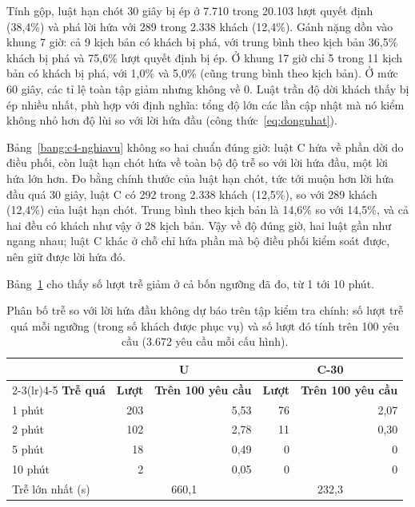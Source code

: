 Tính gộp, luật hạn chót 30 giây bị ép ở 7.710 trong 20.103 lượt quyết định (38,4\%) và phá lời hứa với 289 trong 2.338
khách (12,4\%). Gánh nặng dồn vào khung 7 giờ: cả 9 kịch bản có khách bị phá, với trung bình theo kịch bản 36,5\%
khách bị phá và 75,6\% lượt quyết định bị ép. Ở khung 17 giờ chỉ 5 trong 11 kịch bản có khách bị phá, với 1,0\% và
5,0\% (cũng trung bình theo kịch bản). Ở mức 60 giây, các tỉ lệ toàn tập giảm nhưng không về 0. Luật trần độ dời khách
thấy bị ép nhiều nhất, phù hợp với định nghĩa: tổng độ lớn các lần cập nhật mà nó kiểm không nhỏ hơn độ lùi so với lời
hứa đầu (công thức~\eqref{eq:dongnhat}).

Bảng~\ref{bang:c4-nghiavu} không so hai chuẩn đúng giờ: luật C hứa về phần dời do điều phối, còn luật hạn chót hứa về
toàn bộ độ trễ so với lời hứa đầu, một lời hứa lớn hơn. Đo bằng chính thước của luật hạn chót, tức tới muộn hơn lời
hứa đầu quá 30 giây, luật C có 292 trong 2.338 khách (12,5\%), so với 289 khách (12,4\%) của luật hạn chót. Trung bình
theo kịch bản là 14,6\% so với 14,5\%, và cả hai đều có khách như vậy ở 28 kịch bản. Vậy về độ đúng giờ, hai luật gần
như ngang nhau; luật C khác ở chỗ chỉ hứa phần mà bộ điều phối kiểm soát được, nên giữ được lời hứa đó.

Bảng~\ref{bang:c4-phanbotre} cho thấy số lượt trễ giảm ở cả bốn ngưỡng đã đo, từ 1 tới 10 phút.

\begin{table}[htbp]
\centering
\caption{Phân bố trễ so với lời hứa đầu không dự báo trên tập kiểm tra chính: số lượt trễ quá mỗi ngưỡng
(trong số khách được phục vụ) và số lượt đó tính trên 100 yêu cầu (3.672 yêu cầu mỗi cấu hình).}
\label{bang:c4-phanbotre}
\small
\begin{tabular}{@{}lrrrr@{}}
\toprule
& \multicolumn{2}{c}{\textbf{U}} & \multicolumn{2}{c}{\textbf{C-30}}\\
\cmidrule(lr){2-3}\cmidrule(lr){4-5}
\textbf{Trễ quá} & \textbf{Lượt} & \textbf{Trên 100 yêu cầu} & \textbf{Lượt} & \textbf{Trên 100 yêu cầu}\\
\midrule
1 phút & 203 & 5,53 & 76 & 2,07\\
2 phút & 102 & 2,78 & 11 & 0,30\\
5 phút & 18 & 0,49 & 0 & 0\\
10 phút & 2 & 0,05 & 0 & 0\\
\midrule
Trễ lớn nhất (s) & \multicolumn{2}{c}{660,1} & \multicolumn{2}{c}{232,3}\\
\bottomrule
\end{tabular}
\end{table}

